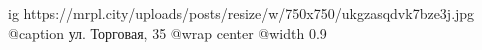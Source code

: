  
 
 
 
 

\ifcmt
  ig https://mrpl.city/uploads/posts/resize/w/750x750/ukgzasqdvk7bze3j.jpg
	@caption ул. Торговая, 35
  @wrap center
  @width 0.9
\fi
